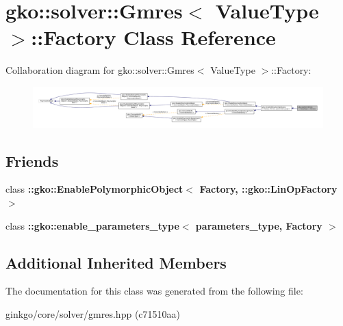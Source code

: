 \hypertarget{classgko_1_1solver_1_1Gmres_1_1Factory}{}\section{gko\+:\+:solver\+:\+:Gmres$<$ Value\+Type $>$\+:\+:Factory Class Reference}
\label{classgko_1_1solver_1_1Gmres_1_1Factory}


Collaboration diagram for gko\+:\+:solver\+:\+:Gmres$<$ Value\+Type $>$\+:\+:Factory\+:
\nopagebreak
\begin{figure}[H]
\begin{center}
\leavevmode
\includegraphics[width=350pt]{classgko_1_1solver_1_1Gmres_1_1Factory__coll__graph}
\end{center}
\end{figure}
\subsection*{Friends}
\begin{DoxyCompactItemize}
\item 
\mbox{\label{classgko_1_1solver_1_1Gmres_1_1Factory_a27e9bbc94a1c1c59f40833153eda8f78}} 
class {\bfseries \+::gko\+::\+Enable\+Polymorphic\+Object$<$ Factory, \+::gko\+::\+Lin\+Op\+Factory $>$}
\item 
\mbox{\label{classgko_1_1solver_1_1Gmres_1_1Factory_a0d176cbd42d6214e11aee8c30ca256fc}} 
class {\bfseries \+::gko\+::enable\+\_\+parameters\+\_\+type$<$ parameters\+\_\+type, Factory $>$}
\end{DoxyCompactItemize}
\subsection*{Additional Inherited Members}


The documentation for this class was generated from the following file\+:\begin{DoxyCompactItemize}
\item 
ginkgo/core/solver/gmres.\+hpp (c71510aa)\end{DoxyCompactItemize}
